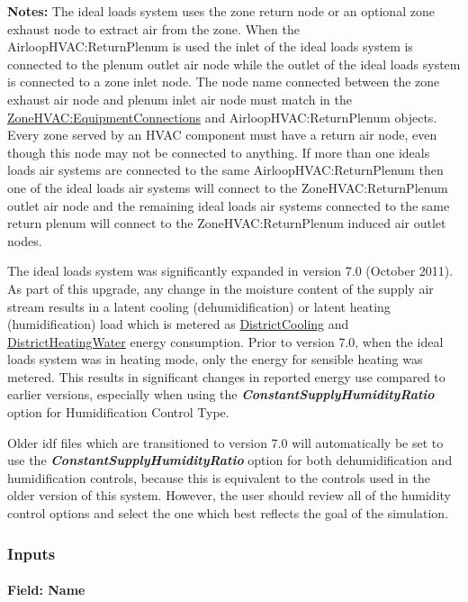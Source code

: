 \textbf{Notes:} The ideal loads system uses the zone return node or an optional zone exhaust node to extract air from the zone. When the AirloopHVAC:ReturnPlenum is used the inlet of the ideal loads system is connected to the plenum outlet air node while the outlet of the ideal loads system is connected to a zone inlet node. The node name connected between the zone exhaust air node and plenum inlet air node must match in the \hyperref[zonehvacequipmentconnections]{ZoneHVAC:EquipmentConnections} and AirloopHVAC:ReturnPlenum objects. Every zone served by an HVAC component must have a return air node, even though this node may not be connected to anything. If more than one ideals loads air systems are connected to the same AirloopHVAC:ReturnPlenum then one of the ideal loads air systems will connect to the ZoneHVAC:ReturnPlenum outlet air node and the remaining ideal loads air systems connected to the same return plenum will connect to the ZoneHVAC:ReturnPlenum induced air outlet nodes.

The ideal loads system was significantly expanded in version 7.0 (October 2011). As part of this upgrade, any change in the moisture content of the supply air stream results in a latent cooling (dehumidification) or latent heating (humidification) load which is metered as \hyperref[districtcooling]{DistrictCooling} and \hyperref[districtheating]{DistrictHeatingWater} energy consumption. Prior to version 7.0, when the ideal loads system was in heating mode, only the energy for sensible heating was metered. This results in significant changes in reported energy use compared to earlier versions, especially when using the \textbf{\emph{ConstantSupplyHumidityRatio}} option for Humidification Control Type.

Older idf files which are transitioned to version 7.0 will automatically be set to use the \textbf{\emph{ConstantSupplyHumidityRatio}} option for both dehumidification and humidification controls, because this is equivalent to the controls used in the older version of this system. However, the user should review all of the humidity control options and select the one which best reflects the goal of the simulation.

\subsubsection{Inputs}\label{inputs-056}

\paragraph{Field: Name}\label{field-name-054}

